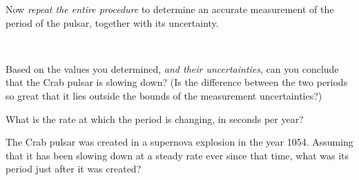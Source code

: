 Now {\it repeat the entire procedure} to determine an accurate measurement
of the period of the pulsar, together with its uncertainty.

\newpage

\ \ \ 
\vfill

Based on the values you determined, {\it and their uncertainties},
can you conclude that the Crab
pulsar is slowing down?  (Is the difference between the two periods so great
that it lies outside the bounds of the measurement uncertainties?)

\vskip 1in

What is the rate at which the period is changing, in seconds per year?

\vskip 1in

The Crab pulsar was created in a supernova explosion in the year 1054.
Assuming that it has been slowing down at a steady rate ever since that
time, what was its period just after it was created?

\vskip 1in
\eject
